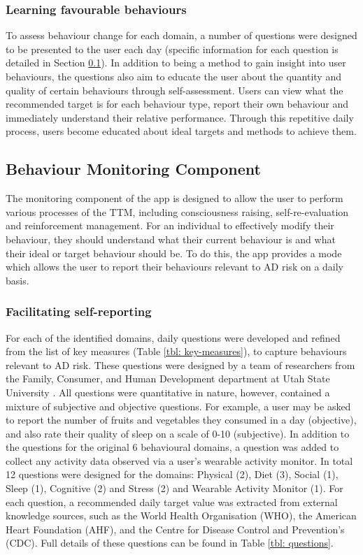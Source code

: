 \subsubsection{Learning favourable behaviours}
To assess behaviour change for each domain, a number of questions were designed to be presented to the user each day (specific information for each question is detailed in Section \ref{subsection-montoringcomponent}). In addition to being a method to gain insight into user behaviours, the questions also aim to educate the user about the quantity and quality of certain behaviours through self-assessment. Users can view what the recommended target is for each behaviour type, report their own behaviour and immediately understand their relative performance. Through this repetitive daily process, users become educated about ideal targets and methods to achieve them.

\subsection{Behaviour Monitoring Component} \label{subsection-montoringcomponent}
The monitoring component of the app is designed to allow the user to perform various processes of the TTM, including consciousness raising, self-re-evaluation and reinforcement management. For an individual to effectively modify their behaviour, they should understand what their current behaviour is and what their ideal or target behaviour should be. To do this, the app provides a mode which allows the user to report their behaviours relevant to AD risk on a daily basis.

\subsubsection{Facilitating self-reporting}
For each of the identified domains, daily questions were developed and refined from the list of key measures (Table \ref{tbl: key-measures}), to capture behaviours relevant to AD risk. These questions were designed by a team of researchers from the Family, Consumer, and Human Development department at Utah State University \cite{Norton2015-TRCI}. All questions were quantitative in nature, however, contained a mixture of subjective and objective questions. For example, a user may be asked to report the number of fruits and vegetables they consumed in a day (objective), and also rate their quality of sleep on a scale of 0-10 (subjective).
In addition to the questions for the original 6 behavioural domains, a question was added to collect any activity data observed via a user's wearable activity monitor. In total 12 questions were designed for the domains: Physical (2), Diet (3), Social (1), Sleep (1), Cognitive (2) and Stress (2) and Wearable Activity Monitor (1). For each question, a recommended daily target value was extracted from external knowledge sources, such as the World Health Organisation (WHO), the American Heart Foundation (AHF), and the Centre for Disease Control and Prevention’s (CDC). Full details of these questions can be found in Table \ref{tbl: questions}.

